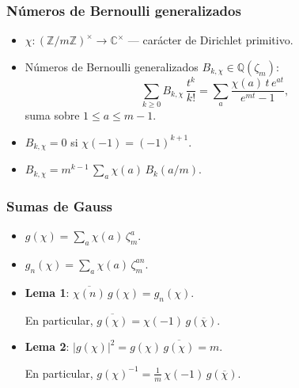 \documentclass[handout]{beamer}
\newcommand{\ZZ}{\mathbb{Z}}
\newcommand{\QQ}{\mathbb{Q}}
\newcommand{\CC}{\mathbb{C}}
\begin{document}

\begin{frame}
  \frametitle{Números de Bernoulli generalizados}

  \begin{itemize}
  \item<1-> $\chi\colon (\ZZ/m\ZZ)^\times \to \CC^\times$ --- carácter de Dirichlet primitivo.

  \item<2-> Números de Bernoulli generalizados $B_{k,\chi} \in \QQ (\zeta_m)$:
    $$\sum_{k\ge 0} B_{k,\chi}\,\frac{t^k}{k!} = \sum_a \frac{\chi (a)\,t\,e^{at}}{e^{mt} - 1},$$
    suma sobre $1 \le a \le m-1$.
  \end{itemize}

  \begin{itemize}
  \item<3-> $B_{k,\chi} = 0$ si $\chi (-1) = (-1)^{k+1}$.

  \item<4-> $B_{k,\chi} = m^{k-1} \, \sum_a \chi (a)\,B_k (a/m)$.
  \end{itemize}
\end{frame}


\begin{frame}
  \frametitle{Sumas de Gauss}

  \begin{itemize}
  \item<1-> $g (\chi) = \sum_a \chi (a) \, \zeta_m^a$.

  \item<2-> $g_n (\chi) = \sum_a \chi (a) \, \zeta_m^{an}$.

  \item<3-> \textbf{Lema 1}: $\overline{\chi (n)} \, g (\chi) = g_n (\chi)$.

    En particular, $\overline{g (\chi)} = \chi (-1)\,g (\overline{\chi})$.

  \item<4-> \textbf{Lema 2}: $|g (\chi)|^2 = g (\chi)\,\overline{g (\chi)} = m$.

  En particular,
  $g (\chi)^{-1} = \frac{1}{m}\,\chi (-1)\,g (\overline{\chi})$.
  \end{itemize}
\end{frame}

\end{document}
